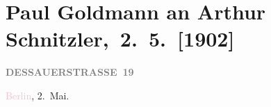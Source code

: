 

\renewcommand{\erwaehntePersonen}{Personen: Ernest von Gréger-Jurco, Gerhart Hauptmann, Olga Schnitzler, Karl Schönherr, Karl Strecker}
\renewcommand{\erwaehnteInstitutionen}{Institutionen: Tägliche Rundschau}
\renewcommand{\erwaehnteOrte}{Orte: Berlin, Brühl, Dessauer Straße, Deutschland, Wien}
\renewcommand{\erwaehnteWerke}{Werke: Das angebliche Telegramm Arthur Schnitzlers, Der Sonnwendtag. Drama in fünf Akten, Die Weber, Ein litterarisch-dramatisches Hochstapler-Stücklein, Tägliche Rundschau}
\section[ Paul Goldmann an Arthur Schnitzler, 2. 5. {[}1902{]}]{Paul Goldmann an Arthur Schnitzler, 2. 5. {[}1902{]}}
\nopagebreak{}
\rehead{ }\normalsize\beginnumbering{}
\toendnotes[C]{\smallbreak\pagebreak[2]}
\toendnotes[C]{\smallbreak}
\pstart
           \noindent{}\raggedleft{}{\pb}\textcolor{pink}{\textcolor{gray}{\textbf{DESSAUERSTRASSE 19}}}{}\ledrightnote{\textcolor{pink}{Dessauer Straße}}\pend
           
\pstart
           \textcolor{pink}{Berlin}{}\ledrightnote{\textcolor{pink}{Berlin}}, 2. Mai.\pend
           
